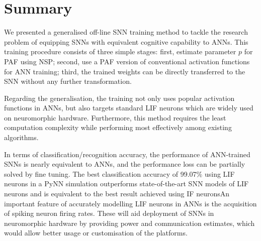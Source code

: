 \section{Summary}
	We presented a generalised off-line SNN training method to tackle the research problem of equipping SNNs with equivalent cognitive capability to ANNs.
	This training procedure consists of three simple stages: first, estimate parameter $p$ for PAF using NSP; second, use a PAF version of conventional activation functions for ANN training; %
	third, the trained weights can be directly transferred to the SNN without any further transformation.
	\DIFaddbegin {}

	
	\DIFaddend Regarding the generalisation, the training not only uses popular activation functions in ANNs, \DIFaddbegin {}\DIFaddend but also targets standard LIF neurons which are widely used on neuromorphic hardware.
	\DIFaddbegin {}\DIFaddend Furthermore, this method requires the least computation complexity while performing most effectively among existing algorithms.
	\DIFdelbegin %

\DIFdelend In terms of classification/recognition accuracy, the performance of ANN-trained SNNs is nearly equivalent to ANNs, and the performance loss can be partially solved by fine tuning.
	The best classification accuracy of 99.07\% using LIF neurons in a PyNN simulation outperforms state-of-the-art SNN models of LIF neurons and is equivalent to the best result achieved using IF neurons\DIFdelbegin {}\DIFdelend \DIFaddbegin {}\DIFaddend An important feature of accurately modelling LIF neurons in ANNs is the acquisition of spiking neuron firing rates. These will aid deployment of SNNs in neuromorphic hardware by providing power and communication estimates, which would allow better usage or customisation of the platforms.